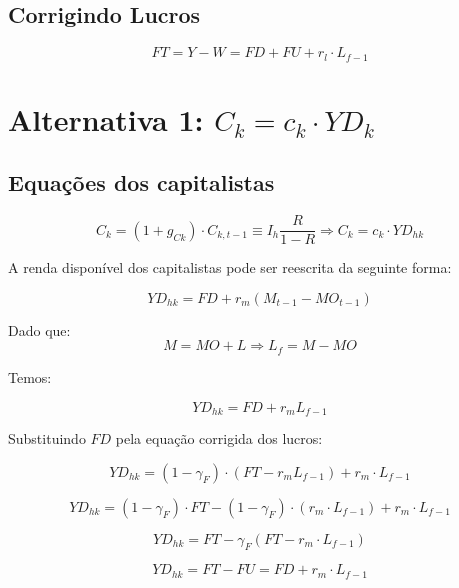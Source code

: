 \documentclass[11pt]{article}
\begin{document}
\subsection*{Corrigindo Lucros}
\label{sec:org7fc0343}

\begin{latex}
\begin{equation}
FT = Y - W = FD + FU + r_{l}\cdot L_{f-1}
\end{equation}
\end{latex}
\section*{Alternativa 1: \(C_{k} = c_{k}\cdot YD_{k}\)}
\label{sec:org5b84fae}

\subsection*{Equações dos capitalistas}
\label{sec:org0a8ce68}

\begin{latex}
\begin{equation}
C_{k} = (1+g_{Ck})\cdot C_{k, t-1} \equiv I_{h}\frac{R}{1-R} \Rightarrow C_{k} = c_{k}\cdot YD_{hk}
\end{equation}
\end{latex}

A renda disponível dos capitalistas pode ser reescrita da seguinte forma:
\begin{latex}
\begin{equation}
YD_{hk} = FD + r_{m}(M_{t-1} - MO_{t-1})
\end{equation}
\end{latex}
Dado que:
$$
M = MO + L \Rightarrow L_{f} = M - MO
$$

Temos:
\begin{latex}
\begin{equation}
YD_{hk} = FD + r_{m}L_{f-1}
\end{equation}
\end{latex}
Substituindo \(FD\) pela equação corrigida dos lucros:
\begin{latex}
$$
YD_{hk} = (1-\gamma_{F})\cdot(FT - r_{m}L_{f-1}) + r_{m}\cdot L_{f-1}
$$

$$
YD_{hk} = (1-\gamma_{F})\cdot FT -  (1-\gamma_{F})\cdot (r_{m}\cdot L_{f-1}) + r_{m}\cdot L_{f-1}
$$

$$
YD_{hk} = FT - \gamma_{F}(FT - r_{m}\cdot L_{f-1})
$$

\begin{equation}
YD_{hk} = FT - FU = FD + r_{m}\cdot L_{f-1}
\end{equation}
\end{latex}
\end{document}
